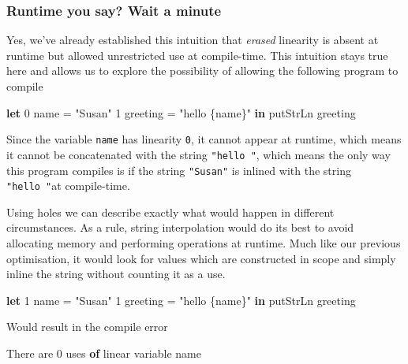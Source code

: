\documentclass[
]{article}
\newenvironment{Shaded}{}{}
\newcommand{\DataTypeTok}[1]{\textcolor[rgb]{0.56,0.13,0.00}{#1}}
\newcommand{\DecValTok}[1]{\textcolor[rgb]{0.25,0.63,0.44}{#1}}
\newcommand{\FunctionTok}[1]{\textcolor[rgb]{0.02,0.16,0.49}{#1}}
\newcommand{\KeywordTok}[1]{\textcolor[rgb]{0.00,0.44,0.13}{\textbf{#1}}}
\newcommand{\NormalTok}[1]{#1}
\newcommand{\OtherTok}[1]{\textcolor[rgb]{0.00,0.44,0.13}{#1}}
\newcommand{\StringTok}[1]{\textcolor[rgb]{0.25,0.44,0.63}{#1}}
\begin{document}
\hypertarget{runtime-you-say-wait-a-minute}{%
\subsubsection{Runtime you say? Wait a
minute}\label{runtime-you-say-wait-a-minute}}

Yes, we've already established this intuition that \emph{erased}
linearity is absent at runtime but allowed unrestricted use at
compile-time. This intuition stays true here and allows us to explore
the possibility of allowing the following program to compile

\begin{Shaded}
\begin{Highlighting}[]
\KeywordTok{let} \DecValTok{0}\NormalTok{ name }\OtherTok{=} \StringTok{"Susan"} 
    \DecValTok{1}\NormalTok{ greeting }\OtherTok{=} \StringTok{"hello \{name\}"} \KeywordTok{in}
    \FunctionTok{putStrLn}\NormalTok{ greeting}
\end{Highlighting}
\end{Shaded}

Since the variable \texttt{name} has linearity \texttt{0}, it cannot
appear at runtime, which means it cannot be concatenated with the string
\texttt{"hello\ "}, which means the only way this program compiles is if
the string \texttt{"Susan"} is inlined with the string
\texttt{"hello\ "}at compile-time.

Using holes we can describe exactly what would happen in different
circumstances. As a rule, string interpolation would do its best to
avoid allocating memory and performing operations at runtime. Much like
our previous optimisation, it would look for values which are
constructed in scope and simply inline the string without counting it as
a use.

\begin{Shaded}
\begin{Highlighting}[]
\KeywordTok{let} \DecValTok{1}\NormalTok{ name }\OtherTok{=} \StringTok{"Susan"}
    \DecValTok{1}\NormalTok{ greeting }\OtherTok{=} \StringTok{"hello \{name\}"} \KeywordTok{in}
    \FunctionTok{putStrLn}\NormalTok{ greeting}
\end{Highlighting}
\end{Shaded}

Would result in the compile error

\begin{Shaded}
\begin{Highlighting}[]
\DataTypeTok{There}\NormalTok{ are }\DecValTok{0}\NormalTok{ uses }\KeywordTok{of}\NormalTok{ linear variable name}
\end{Highlighting}
\end{Shaded}
\end{document}
